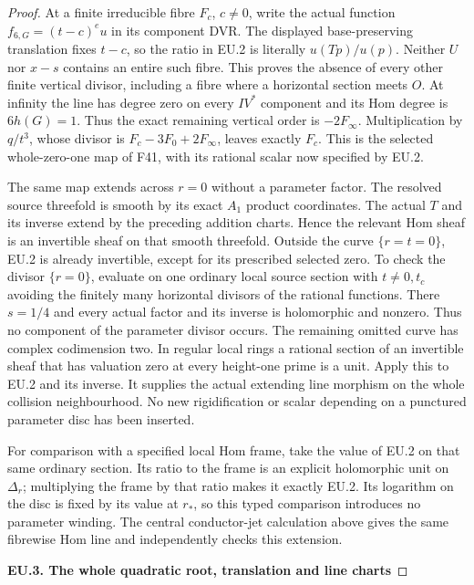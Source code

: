 \begin{proof}
At a finite irreducible fibre \(F_c\), \(c\ne0\), write the actual
function \(f_{6,G}=(t-c)^e u\) in its component DVR. The displayed
base-preserving translation fixes \(t-c\), so the ratio in EU.2 is
literally \(u(Tp)/u(p)\). Neither \(U\) nor \(x-s\) contains an
entire such fibre. This proves the absence of every other finite
vertical divisor, including a fibre where a horizontal section
meets \(O\). At infinity the line has degree zero on every \(IV^*\)
component and its Hom degree is \(6h(G)=1\). Thus the exact remaining
vertical order is \(-2F_\infty\). Multiplication by \(q/t^3\), whose
divisor is \(F_c-3F_0+2F_\infty\), leaves exactly \(F_c\). This is
the selected whole-zero-one map of F41, with its rational scalar now
specified by EU.2.

The same map extends across \(r=0\) without a parameter factor. The
resolved source threefold is smooth by its exact \(A_1\) product
coordinates. The actual \(T\) and its inverse extend by the preceding
addition charts. Hence the relevant Hom sheaf is an invertible sheaf
on that smooth threefold. Outside the curve \(\{r=t=0\}\), EU.2 is
already invertible, except for its prescribed selected zero. To check
the divisor \(\{r=0\}\), evaluate on one ordinary local source
section with \(t\ne0,t_c\) avoiding the finitely many horizontal
divisors of the rational functions. There \(s=1/4\) and every actual
factor and its inverse is holomorphic and nonzero. Thus no component
of the parameter divisor occurs. The remaining omitted curve has
complex codimension two. In regular local rings a rational section
of an invertible sheaf that has valuation zero at every height-one
prime is a unit. Apply this to EU.2 and its inverse. It supplies the
actual extending line morphism on the whole collision neighbourhood.
No new rigidification or scalar depending on a punctured parameter
disc has been inserted.

For comparison with a specified local Hom frame, take the value of
EU.2 on that same ordinary section. Its ratio to the frame is an
explicit holomorphic unit on \(\Delta_r\); multiplying the frame by
that ratio makes it exactly EU.2. Its logarithm on the disc is fixed
by its value at \(r_*\), so this typed comparison introduces no
parameter winding. The central conductor-jet calculation above gives
the same fibrewise Hom line and independently checks this extension.

\par

\medskip\noindent\textbf{EU.3. The whole quadratic root, translation and line charts}


\end{proof}
